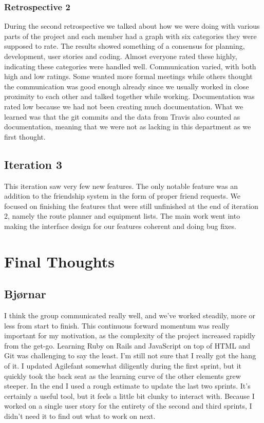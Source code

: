 \documentclass[a4paper]{article}
\begin{document}
\subsubsection{Retrospective 2}
During the second retrospective we talked about how we were doing with various parts of the project and each member had a graph with six categories they were supposed to rate. The results showed something of a consensus for planning, development, user stories and coding. Almost everyone rated these highly, indicating these categories were handled well. Communication varied, with both high and low ratings. Some wanted more formal meetings while others thought the communication was good enough already since we usually worked in close proximity to each other and talked together while working. Documentation was rated low because we had not been creating much documentation. What we learned was that the git commits and the data from Travis also counted as documentation, meaning that we were not as lacking in this department as we first thought.

\subsection{Iteration 3}
This iteration saw very few new features. The only notable feature was an addition to the friendship system in the form of proper friend requests. We focused on finishing the features that were still unfinished at the end of iteration 2, namely the route planner and equipment lists. The main work went into making the interface design for our features coherent and doing bug fixes.


\section{Final Thoughts}

\subsection{Bjørnar}
I think the group communicated really well, and we've worked steadily, more or less from start to finish. This continuous forward momentum was really important for my motivation, as the complexity of the project increased rapidly from the get-go. Learning Ruby on Rails and JavaScript on top of HTML and Git was challenging to say the least. I'm still not sure that I really got the hang of it. I updated Agilefant somewhat diligently during the first sprint, but it quickly took the back seat as the learning curve of the other elements grew steeper. In the end I used a rough estimate to update the last two sprints. It's certainly a useful tool, but it feels a little bit clunky to interact with. Because I worked on a single user story for the entirety of the second and third sprints, I didn't need it to find out what to work on next.\\
\end{document}
